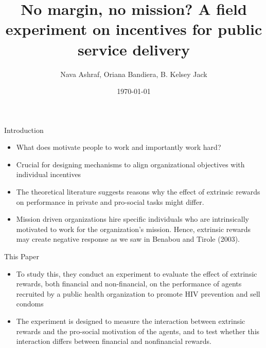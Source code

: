 \documentclass{beamer}
\begin{document}
\title{No margin, no mission? A field experiment on incentives for public
service delivery}
\author{Nava Ashraf, Oriana Bandiera, B. Kelsey Jack}

\date{\today}

\frame{\titlepage}

\begin{frame}{Introduction}
\begin{itemize}
    \item What does motivate people to work and importantly work hard?
    \item Crucial for designing mechanisms to align organizational objectives with individual incentives
    \item The theoretical literature suggests reasons why the effect of extrinsic
    rewards on performance in private and pro-social tasks might differ.
    \item Mission driven organizations hire specific individuals who are intrinsically motivated to work for the organization’s mission. Hence, extrinsic rewards may create negative response as we saw in Benabou and Tirole (2003).

\end{itemize}

\end{frame}

\begin{frame}{This Paper}
\begin{itemize}
    \item To study this, they conduct an experiment to  evaluate the effect of extrinsic rewards, both financial and non-financial, on the performance of agents recruited by a public health organization to promote HIV prevention and sell condoms
    \item The experiment is designed to measure the interaction
    between extrinsic rewards and the pro-social motivation of the agents, and to test whether this interaction differs between financial and nonfinancial rewards.
    
\end{itemize}

\end{frame}
\end{document}
